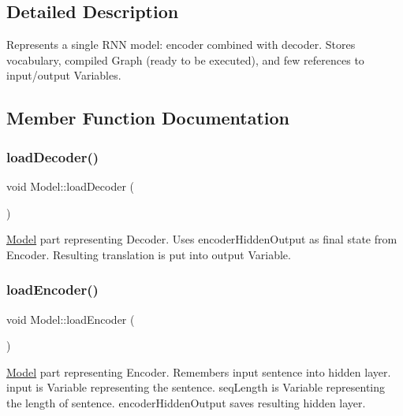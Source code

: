 \subsection{Detailed Description}
Represents a single R\+NN model\+: encoder combined with decoder. Stores vocabulary, compiled Graph (ready to be executed), and few references to input/output Variables. 

\subsection{Member Function Documentation}
\mbox{\label{struct_model_aa2ab414d8bdb1eb04067342884e2233d}} 
\subsubsection{\texorpdfstring{load\+Decoder()}{loadDecoder()}}
{\footnotesize\ttfamily void Model\+::load\+Decoder (\begin{DoxyParamCaption}{ }\end{DoxyParamCaption})}

\hyperlink{struct_model}{Model} part representing Decoder. Uses {\ttfamily encoder\+Hidden\+Output} as final state from Encoder. Resulting translation is put into {\ttfamily output} Variable. \mbox{\label{struct_model_aefa237830b190008efb400d88b3c8e6a}} 
\subsubsection{\texorpdfstring{load\+Encoder()}{loadEncoder()}}
{\footnotesize\ttfamily void Model\+::load\+Encoder (\begin{DoxyParamCaption}{ }\end{DoxyParamCaption})}

\hyperlink{struct_model}{Model} part representing Encoder. Remembers input sentence into hidden layer. {\ttfamily input} is Variable representing the sentence. {\ttfamily seq\+Length} is Variable representing the length of sentence. {\ttfamily encoder\+Hidden\+Output} saves resulting hidden layer. \mbox{\label{struct_model_ae148ec2146ad1d9b129809304136b6f0}} 
